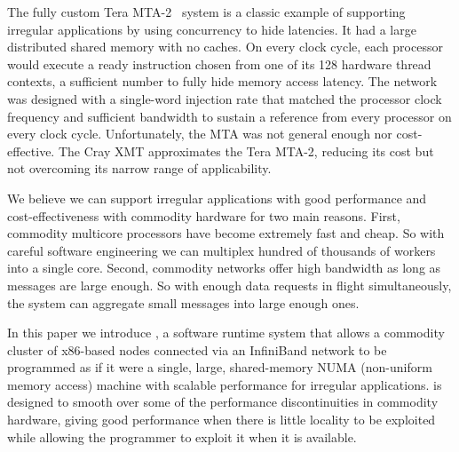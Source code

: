 The fully custom Tera MTA-2~\cite{tera:mta1} system is a classic example of
supporting irregular applications by using concurrency to hide latencies. It
had a large distributed shared memory with no caches. On every clock cycle,
each processor would execute a ready instruction chosen from one of its 128
hardware thread contexts, a sufficient number to fully hide memory access
latency. The network was designed with a single-word injection rate that
matched the processor clock frequency and sufficient bandwidth to sustain a
reference from every processor on every clock cycle. Unfortunately, the MTA
was not general enough nor cost-effective. The Cray XMT approximates the Tera
MTA-2, reducing its cost but not overcoming its narrow range of applicability.

We believe we can support irregular applications with good performance and
cost-effectiveness with commodity hardware for two main reasons. First,
commodity multicore processors have become extremely fast and cheap. So with
careful software engineering we can multiplex hundred of thousands of
workers into a single core. Second, commodity networks offer high
bandwidth as long as messages are large enough. So with enough data requests
in flight simultaneously, the system can aggregate small messages into large
enough ones.

In this paper we introduce \Grappa, a software runtime system that allows a
commodity cluster of x86-based nodes connected via an InfiniBand network to be
programmed as if it were a single, large, shared-memory NUMA (non-uniform
memory access) machine with scalable performance for irregular applications.
\Grappa is designed to smooth over some of the performance discontinuities in
commodity hardware, giving good performance when there is little locality to
be exploited while allowing the programmer to exploit it when it is available.

